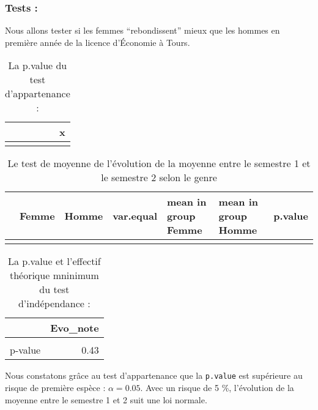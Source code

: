 \documentclass[
  11pt,
  french,
]{article}
\begin{document}
\hypertarget{tests-1}{%
\subsubsection{Tests :}\label{tests-1}}

Nous allons tester si les femmes ``rebondissent'' mieux que les hommes
en première année de la licence d'Économie à Tours.

\begin{table}[!h]

\caption{\label{tab:tests2_non}La p.value du test d'appartenance :}
\centering
\begin{tabular}[t]{lr}
\toprule
  & x\\
\midrule
\cellcolor{gray!6}{Evo\_note.p.value} & \cellcolor{gray!6}{0.39}\\
\bottomrule
\end{tabular}
\end{table}

\begin{table}[!h]

\caption{\label{tab:tests2_non}Le test de moyenne de l'évolution de la moyenne entre le semestre 1 et le semestre 2 selon le genre}
\centering
\begin{tabular}[t]{lllllll}
\toprule
  & Femme & Homme & var.equal & mean in group Femme & mean in group Homme & p.value\\
\midrule
\cellcolor{gray!6}{Evo\_note} & \cellcolor{gray!6}{26} & \cellcolor{gray!6}{22} & \cellcolor{gray!6}{Non} & \cellcolor{gray!6}{29.88} & \cellcolor{gray!6}{9.83} & \cellcolor{gray!6}{0.01}\\
\bottomrule
\end{tabular}
\end{table}

\begin{table}[!h]

\caption{\label{tab:tests2_non}La p.value et l'effectif théorique mninimum du test d'indépendance :}
\centering
\begin{tabular}[t]{lr}
\toprule
  & Evo\_note\\
\midrule
\cellcolor{gray!6}{Eff\_théorique\_min} & \cellcolor{gray!6}{0.46}\\
p-value & 0.43\\
\bottomrule
\end{tabular}
\end{table}

Nous constatons grâce au test d'appartenance que la \texttt{p.value} est
supérieure au risque de première espèce : \(\alpha = 0.05\). Avec un
risque de 5 \%, l'évolution de la moyenne entre le semestre 1 et 2 suit
une loi normale.
\end{document}
